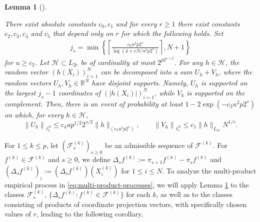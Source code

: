 \documentclass[numbers,webpdf,imaiai]{ima-authoring-template}
\theoremstyle{thmstyletwo}%
\newtheorem{lemma}[theorem]{Lemma}
\numberwithin{equation}{section}
\numberwithin{equation}{section}
\providecommand{\mathbbm}{\mathbb} %
\newcommand{\R}{\mathbbm{R}}
\newcommand{\F}{\mathcal{F}}
\begin{document}
\begin{lemma}[{\cite[Corollary 3.6]{mendelson2016upper}}]\label{lemma:mendelson}

There exist absolute constants $c_0, c_1$ and for every $r \ge 1$ there exist constants $c_2, c_3, c_4$ and $c_5$ that depend only on $r$ for which the following holds. Set
\begin{align}\label{eq:j_s}
j_s =\min \left\{\left\lceil
\frac{c_0 u^2 p 2^s}{\log \left(4+e N / u^2 p2^s\right)}\right\rceil, N+1\right\}
\end{align}
for $u \geq c_2$. Let $\mathcal{H} \subset L_{2r}$  be of cardinality at most $2^{p2^{s+2}}$. For any $h\in \mathcal{H}$, the random vector $\left(h\left(X_i\right)\right)_{i=1}^N$ can be decomposed into a sum $U_h+V_h$, where the random vectors $U_h,V_h \in \R^N$ have disjoint supports. Namely, $U_h$ is supported on the largest $j_s-1$ coordinates of $\left(\left|h\left(X_i\right)\right|\right)_{i=1}^N$, while $V_h$ is supported on the complement. Then, there is an event of probability at least $1-2 \exp \left(-c_3 u^2 p 2^s\right)$ on which, for every $h \in \mathcal{H}$,
$$
\left\|U_h\right\|_{\ell_2^N} \leq c_4 u p^{1/2}2^{s / 2}\|h\|_{(c_5 u^2 p 2^s)}, \quad  
\quad\left\|V_h\right\|_{\ell_r^N} \leq c_1 \|h\|_{L_{2r}} N^{1 / r}.
$$
\end{lemma}

For $1\le k\le p$, let $(\F^{(k)}_s)_{s \geq 0}$ be an admissible sequence of $\F^{(k)}$. For $f^{(k)}\in \F^{(k)}$ and $s\ge 0$, we define $\Delta_s f^{(k)} := \pi_{s+1}f^{(k)}-\pi_sf^{(k)}$ and $(\Delta_s f^{(k)})_i := (\Delta_s f^{(k)})(X^{(k)}_i)$ for $1\le i\le N$. To analyze the multi-product empirical process in \eqref{eq:multi-product-processes}, we will apply Lemma \ref{lemma:mendelson} to the classes $\F^{(k)}_s$, $\{\Delta_s f^{(k)}:f^{(k)}\in \F^{(k)}\}$ for each $k$, as well as to the classes consisting of products of coordinate projection vectors, with specifically chosen values of $r$, leading to the following corollary.
\end{document}
